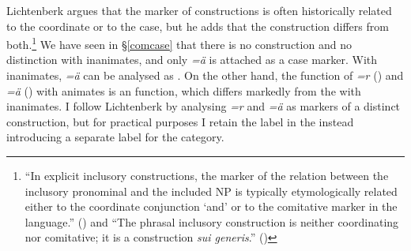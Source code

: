 Lichtenberk argues that the marker of  constructions is often historically related to the coordinate  or to the  case, but he adds that the  construction differs from both.\footnote{``In explicit inclusory constructions, the marker of the relation between the inclusory pronominal and the included NP is typically etymologically related either to the coordinate conjunction `and' or to the comitative marker in the language.'' (\citealt[4]{Lichtenberk:2000hr}) and ``The phrasal inclusory construction is neither coordinating nor comitative; it is a construction \emph{sui generis}.'' (\citeyear[30, emphasis in original]{Lichtenberk:2000hr})} We have seen in \S\ref{comcase} that there is no  construction and no  distinction with inanimates, and only \emph{=ä} is attached as a case marker. With inanimates, \emph{=ä} can be analysed as  . On the other hand, the function of \emph{=r} (\Du) and \emph{=ä} (\Pl) with animates is an  function, which differs markedly from the  with inanimates. I follow Lichtenberk by analysing \emph{=r} and \emph{=ä} as markers of a distinct  construction, but for practical purposes I retain the label {\Assoc} in the  instead introducing a separate label for the  category.